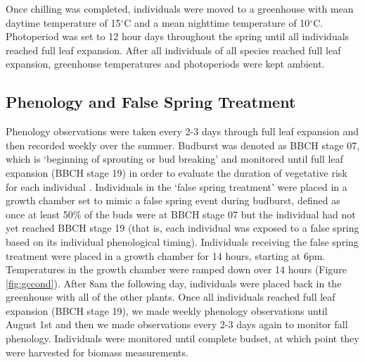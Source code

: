 \documentclass{article}\usepackage[]{graphicx}\usepackage[]{color}
\begin{document}
Once chilling was completed, individuals were moved to a greenhouse with mean daytime temperature of 15$^{\circ}$C and a mean nighttime temperature of 10$^{\circ}$C. Photoperiod was set to 12 hour days throughout the spring until all individuals reached full leaf expansion. After all individuals of all species reached full leaf expansion, greenhouse temperatures and photoperiods were kept ambient. 

\subsection*{Phenology and False Spring Treatment}
Phenology observations were taken every 2-3 days through full leaf expansion and then recorded weekly over the summer. Budburst was denoted as BBCH stage 07, which is `beginning of sprouting or bud breaking' and monitored until full leaf expansion (BBCH stage 19) in order to evaluate the duration of vegetative risk \citep{Chamberlain2019} for each individual \citep{Finn2007}. Individuals in the `false spring treatment' were placed in a growth chamber set to mimic a false spring event during budburst, defined as once at least 50\% of the buds were at BBCH stage 07 but the individual had not yet reached BBCH stage 19 (that is, each individual was exposed to a false spring based on its individual phenological timing). Individuals receiving the false spring treatment were placed in a growth chamber for 14 hours, starting at 6pm. Temperatures in the growth chamber were ramped down over 14 hours (Figure \ref{fig:gccond}). After 8am the following day, individuals were placed back in the greenhouse with all of the other plants. Once all individuals reached full leaf expansion (BBCH stage 19), we made weekly phenology observations until August 1st and then we made observations every 2-3 days again to monitor fall phenology. Individuals were monitored until complete budset, at which point they were harvested for biomass measurements.
\end{document}
